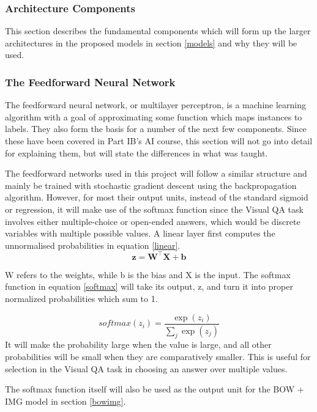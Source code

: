 \documentclass[12pt,a4paper,twoside]{article}
\begin{document}
\subsubsection{Architecture Components}\label{architect}
This section describes the fundamental components which will form up the larger architectures in the proposed models in section \ref{models} and why they will be used.

\subsubsection*{The Feedforward Neural Network}
The feedforward neural network, or multilayer perceptron, is a machine learning algorithm with a goal of approximating some function which maps instances to labels. They also form the basis for a number of the next few components. Since these have been covered in Part IB’s AI course, this section will not go into detail for explaining them, but will state the differences in what was taught. 

The feedforward networks used in this project will follow a similar structure and mainly be trained with stochastic gradient descent using the backpropagation algorithm. However, for most their output units, instead of the standard sigmoid or regression, it will make use of the softmax function since the Visual QA task involves either multiple-choice or open-ended answers, which would be discrete variables with multiple possible values. A linear layer first computes the unnormalised probabilities in equation \ref{linear}.
\begin{equation}\label{linear}
\textbf{z} = \textbf{W}^\top\textbf{X} + \textbf{b}
\end{equation} 

W refers to the weights, while b is the bias and X is the input. The softmax function in equation \ref{softmax} will take its output, z, and turn it into proper normalized probabilities which sum to 1.

\begin{equation}\label{softmax}
softmax(z_i) = \dfrac{\exp{(z_i)}} {\sum_j \exp{(z_j)}}
\end{equation}
 It will make the probability large when the value is large, and all other probabilities will be small when they are comparatively smaller. This is useful for selection in the Visual QA task in choosing an answer over multiple values.
 
The softmax function itself will also be used as the output unit for the BOW + IMG model in section \ref{bowimg}.
\end{document}
